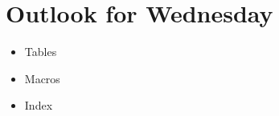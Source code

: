 \documentclass[a4paper,10pt]{report} %
\begin{document}

\section{Outlook for Wednesday}\label{sec:wednesday}

\begin{itemize}
 \item Tables
 \item Macros
 \item Index
\end{itemize}


 
\label{LastPage}
\newpage
\end{document}
